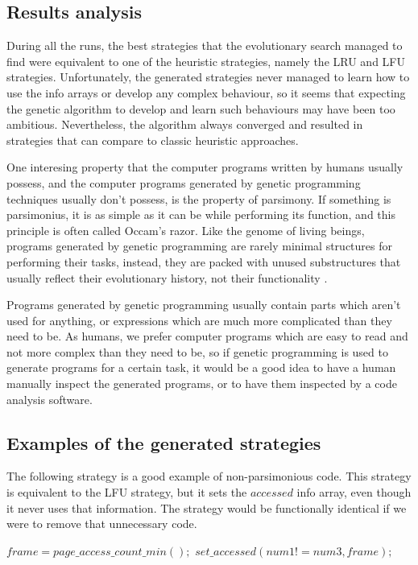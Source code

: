 \subsection{Results analysis}
During all the runs, the best strategies that the evolutionary search managed to find were equivalent to one of the heuristic strategies, namely the LRU and LFU strategies. Unfortunately, the generated strategies never managed to learn how to use the info arrays or develop any complex behaviour, so it seems that expecting the genetic algorithm to develop and learn such behaviours may have been too ambitious. Nevertheless, the algorithm always converged and resulted in strategies that can compare to classic heuristic approaches. 

One interesing property that the computer programs written by humans usually possess, and the computer programs generated by genetic programming techniques usually don't possess, is the property of parsimony. If something is parsimonius, it is as simple as it can be while performing its function, and this principle is often called Occam's razor. Like the genome of living beings, programs generated by genetic programming are rarely minimal structures for performing their tasks, instead, they are packed with unused substructures that usually reflect their evolutionary history, not their functionality \citep{koza1992geneticprogramming}. 

Programs generated by genetic programming usually contain parts which aren't used for anything, or expressions which are much more complicated than they need to be. As humans, we prefer computer programs which are easy to read and not more complex than they need to be, so if genetic programming is used to generate programs for a certain task, it would be a good idea to have a human manually inspect the generated programs, or to have them inspected by a code analysis software.

\subsection{Examples of the generated strategies}
The following strategy is a good example of non-parsimonious code. This strategy is equivalent to the LFU strategy, but it sets the $accessed$ info array, even though it never uses that information. The strategy would be functionally identical if we were to remove that unnecessary code.
\noindent
\begin{algorithmic}
\State $ frame=page\_access\_count\_min();$
\State $ set\_accessed(num1!=num3,frame);$
\end{algorithmic}

